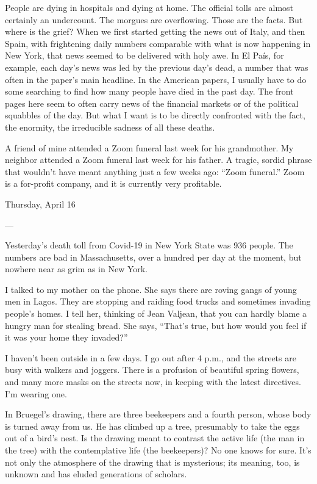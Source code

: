 People are dying in hospitals and dying at home. The official tolls are
almost certainly an undercount. The morgues are overflowing. Those are
the facts. But where is the grief? When we first started getting the
news out of Italy, and then Spain, with frightening daily numbers
comparable with what is now happening in New York, that news seemed to
be delivered with holy awe. In El País, for example, each day's news was
led by the previous day's dead, a number that was often in the paper's
main headline. In the American papers, I usually have to do some
searching to find how many people have died in the past day. The front
pages here seem to often carry news of the financial markets or of the
political squabbles of the day. But what I want is to be directly
confronted with the fact, the enormity, the irreducible sadness of all
these deaths.

A friend of mine attended a Zoom funeral last week for his grandmother.
My neighbor attended a Zoom funeral last week for his father. A tragic,
sordid phrase that wouldn't have meant anything just a few weeks ago:
``Zoom funeral.'' Zoom is a for-profit company, and it is currently very
profitable.

Thursday, April 16

---

Yesterday's death toll from Covid-19 in New York State was 936 people.
The numbers are bad in Massachusetts, over a hundred per day at the
moment, but nowhere near as grim as in New York.

I talked to my mother on the phone. She says there are roving gangs of
young men in Lagos. They are stopping and raiding food trucks and
sometimes invading people's homes. I tell her, thinking of Jean Valjean,
that you can hardly blame a hungry man for stealing bread. She says,
``That's true, but how would you feel if it was your home they
invaded?''

I haven't been outside in a few days. I go out after 4 p.m., and the
streets are busy with walkers and joggers. There is a profusion of
beautiful spring flowers, and many more masks on the streets now, in
keeping with the latest directives. I'm wearing one.

In Bruegel's drawing, there are three beekeepers and a fourth person,
whose body is turned away from us. He has climbed up a tree, presumably
to take the eggs out of a bird's nest. Is the drawing meant to contrast
the active life (the man in the tree) with the contemplative life (the
beekeepers)? No one knows for sure. It's not only the atmosphere of the
drawing that is mysterious; its meaning, too, is unknown and has eluded
generations of scholars.

